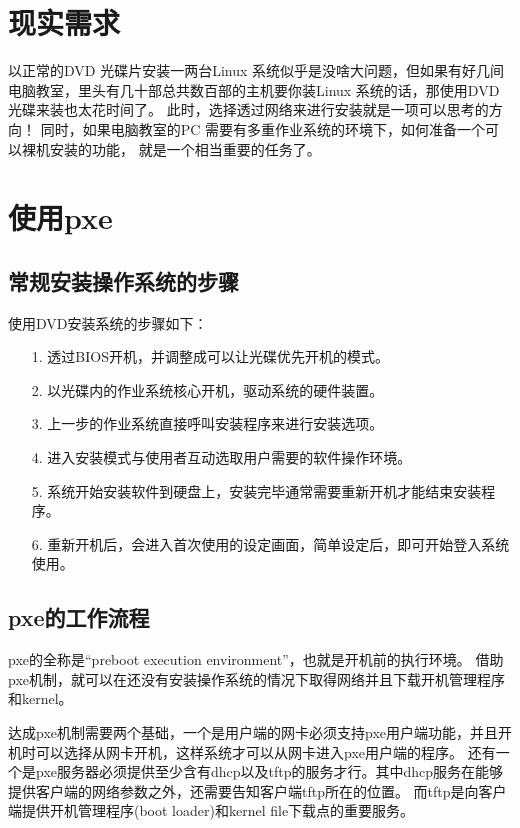 \documentclass[a4paper,left=1.5cm,right=1.5cm,11pt]{article}
\begin{document}
\tableofcontents

\clearpage

\section{现实需求}
	以正常的DVD 光碟片安装一两台Linux 系统似乎是没啥大问题，但如果有好几间电脑教室，里头有几十部总共数百部的主机要你装Linux 系统的话，那使用DVD 光碟来装也太花时间了。
	此时，选择透过网络来进行安装就是一项可以思考的方向！ 
	同时，如果电脑教室的PC 需要有多重作业系统的环境下，如何准备一个可以裸机安装的功能， 就是一个相当重要的任务了。

\section{使用pxe}
\subsection{常规安装操作系统的步骤}
	使用DVD安装系统的步骤如下：
	\begin{itemize}
		\item[1.] 透过BIOS开机，并调整成可以让光碟优先开机的模式。
		\item[2.] 以光碟内的作业系统核心开机，驱动系统的硬件装置。
		\item[3.] 上一步的作业系统直接呼叫安装程序来进行安装选项。
		\item[4.] 进入安装模式与使用者互动选取用户需要的软件操作环境。
		\item[5.] 系统开始安装软件到硬盘上，安装完毕通常需要重新开机才能结束安装程序。
		\item[6.] 重新开机后，会进入首次使用的设定画面，简单设定后，即可开始登入系统使用。
	\end{itemize}

\subsection{pxe的工作流程}

	pxe的全称是“preboot execution environment”，也就是开机前的执行环境。
	借助pxe机制，就可以在还没有安装操作系统的情况下取得网络并且下载开机管理程序和kernel。\par

	达成pxe机制需要两个基础，一个是用户端的网卡必须支持pxe用户端功能，并且开机时可以选择从网卡开机，这样系统才可以从网卡进入pxe用户端的程序。
	还有一个是pxe服务器必须提供至少含有dhcp以及tftp的服务才行。其中dhcp服务在能够提供客户端的网络参数之外，还需要告知客户端tftp所在的位置。
	而tftp是向客户端提供开机管理程序(boot loader)和kernel file下载点的重要服务。\par
\end{document}
